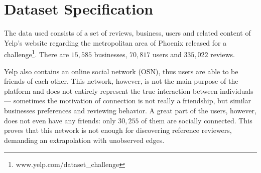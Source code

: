 \section{Dataset Specification}
The data used consists of a set of reviews, business, users and related content of Yelp's website regarding the metropolitan area of Phoenix released for a challenge\footnote{www.yelp.com/dataset\_challenge}. There are $15,585$ businesses, $70,817$ users and $335,022$ reviews.

Yelp also contains an online social network (OSN), thus users are able to be friends of each other. This network, however, is not the main purpose of the platform and does not entirely represent the true interaction between individuals --- sometimes the motivation of connection is not really a friendship, but similar businesses preferences and reviewing behavior. A great part of the users, however, does not even have any friends: only $30,255$ of them are socially connected. This proves that this network is not enough for discovering reference reviewers, demanding an extrapolation with unobserved edges.
